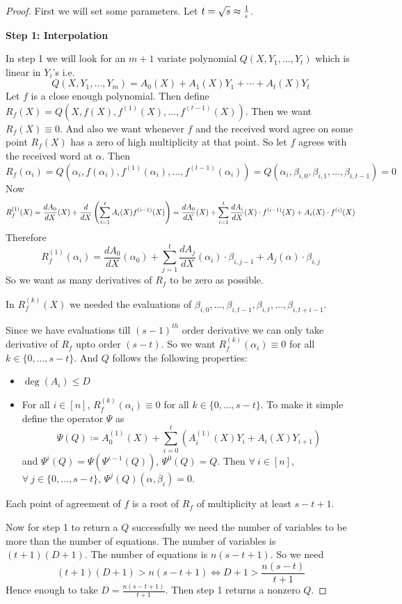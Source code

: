 \begin{proof} First we will set some parameters. Let $t=\sqrt{s}\approx \frac1{\epsilon}$. 

    \textbf{Step 1: Interpolation}


In step 1 we will look for an $m+1$ variate polynomial $Q(X,Y_1,\dots, Y_t)$ which is linear in $Y_i$'s i.e. $$Q(X,Y_1,\dots, Y_m)=A_0(X)+A_1(X)Y_1+\cdots +A_t(X)Y_t$$Let $f$ is a close enough polynomial. Then define $R_f(X)=Q(X,f(X), f^{(1)}(X),\dots, f^{(t-1)}(X))$.  Then we want $R_f(X)\equiv 0$. And also we want whenever $f$ and the received word agree on some point $R_f(X)$ has a zero of high multiplicity at that point. So let $f$ agrees with the received word at $\alpha$. Then $$R_f(\alpha_i)=Q(\alpha_i, f(\alpha_i), f^{(1)}(\alpha_i),\dots, f^{(t-1)}(\alpha_i))=Q(\alpha_i, \beta_{i,0},\beta_{i,1},\dots, \beta_{i,t-1})=0$$Now \begin{align*}
            R_f^{(1)}(X)=\frac{dA_0}{dX}(X)+\frac{d}{dX}\left(\sum\limits_{i=1}^tA_i(X)f^{(i-1)}(X)\right)=\frac{dA_0}{dX}(X)+\sum\limits_{i=1}^t\frac{dA_i}{dX}(X)\cdot f^{(i-1)}(X)+A_i(X)\cdot f^{(i)}(X)
        \end{align*}Therefore $$ R_f^{(1)}(\alpha_i)=\frac{dA_0}{dX}(\alpha_0)+\sum\limits_{j=1}^t\frac{dA_j}{dX}(\alpha_i)\cdot \beta_{i,j-1}+A_j(\alpha)\cdot \beta_{i,j}$$ So we want as many derivatives of $R_f$ to be zero as possible. \begin{observation}
In $R_f^{(k)}(X)$ we needed the evaluations of $\beta_{i,0},\dots, \beta_{i,t-1},\beta_{i,t},\dots, \beta_{i,t+i-1}$.
\end{observation}Since we have evaluations till $(s-1)^{th}$ order derivative we can only take derivative of $R_f$ upto order $(s-t)$. So we want $R_f^{(k)}(\alpha_i)\equiv 0$ for all $k\in\{0,\dots, s-t\}$. And $Q$ follows the following properties:
\begin{itemize}
    \item $\deg(A_i)\leq D$ 
    \item For all $i\in[n]$, $R_f^{(k)}(\alpha_i)\equiv 0$ for all $k\in\{0,\dots, s-t\}$. To make it simple define the operator $\Psi$ as $$\Psi(Q)\coloneqq A_0^{(1)}(X)+ \sum\limits_{i=0}^t(A_i^{(1)}(X)Y_i+A_i(X)Y_{i+1})$$ and $\Psi^i(Q)=\Psi(\Psi^{i-1}(Q))$, $\Psi^0(Q)=Q$. Then $\forall\ i\in[n]$, $\forall\ j\in\{0,\dots, s-t\}$, $\Psi^j(Q)(\alpha,\overline{\beta}_i)=0$.
\end{itemize}
\begin{observation}
    Each point of agreement of $f$ is a root of $R_f$ of multiplicity at least $s-t+1$.
\end{observation}
Now for step 1 to return a $Q$ successfully we need the number of variables to be more than the number of equations. The number of variables is $(t+1)(D+1)$. The number of equations is $n(s-t+1)$. So we need $$(t+1)(D+1)>n(s-t+1)\iff D+1>\frac{n(s-t)}{t+1}$$Hence enough to take $D=\frac{n(s-t+1)}{t+1}$. Then step 1 returns a nonzero $Q$. 


\end{proof}
